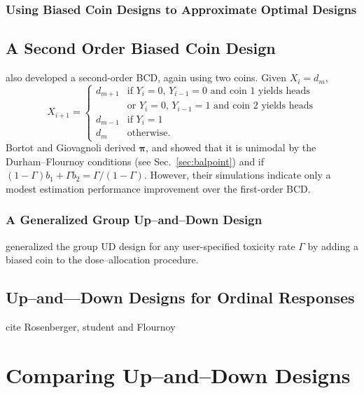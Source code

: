 \subsection{Using Biased Coin Designs to Approximate Optimal Designs}

\section{A Second Order Biased Coin Design}
\cite{Bort:Giov:Upan:2005} also developed a second-order BCD, again using two coins. Given $X_i=d_m$,
%
\begin{equation*}
X_{i+1}=
\begin{cases}
d_{m+1} &\textrm{if $Y_i=0$, $Y_{i-1}=0$ and coin 1 yields heads}\\
        &\textrm{or $Y_i=0$, $Y_{i-1}=1$ and coin 2 yields heads}\\
d_{m-1} &\textrm{if $Y_i=1$}\\
d_m &\textrm{otherwise.}
\end{cases}
\end{equation*}
%
Bortot and Giovagnoli derived $\boldsymbol{\pi}$, and showed that it is unimodal by the Durham--Flournoy conditions (see Sec.~\ref{sec:balpoint}) and if $(1-\Gamma )b_1+\Gamma b_2=\Gamma /(1-\Gamma )$. However, their simulations indicate only a modest estimation performance improvement over the first-order BCD.

\subsection{A Generalized Group Up--and--Down Design}
\cite{Bald:Bort:Giov:2008} generalized the group UD design for any user-specified toxicity rate $\Gamma$ by adding a biased coin to the dose--allocation procedure.

\section{Up--and---Down Designs for Ordinal Responses}
cite Rosenberger, student and Flournoy

\chapter{Comparing Up--and--Down Designs}

